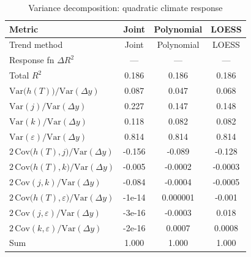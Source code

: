 \begin{table}[htbp]
\centering
\caption{Variance decomposition: quadratic climate response}
\label{tab:variance_decomp_quadratic}

\small
\begin{tabular}{@{}lccc@{}}
\toprule
Metric & Joint & Polynomial & LOESS \\
\midrule
Trend method & Joint & Polynomial & LOESS \\
\midrule
Response fn $\Delta R^2$ & — & — & — \\
Total $R^2$ & 0.186 & 0.186 & 0.186 \\
\midrule
$\mathrm{Var}\!\big(h(T)\big)/\mathrm{Var}(\Delta y)$ & 0.087 & 0.047 & 0.068 \\
$\mathrm{Var}(j)/\mathrm{Var}(\Delta y)$ & 0.227 & 0.147 & 0.148 \\
$\mathrm{Var}(k)/\mathrm{Var}(\Delta y)$ & 0.118 & 0.082 & 0.082 \\
$\mathrm{Var}(\varepsilon)/\mathrm{Var}(\Delta y)$ & 0.814 & 0.814 & 0.814 \\
\midrule
$2\,\mathrm{Cov}\!\big(h(T),j\big)/\mathrm{Var}(\Delta y)$ & -0.156 & -0.089 & -0.128 \\
$2\,\mathrm{Cov}\!\big(h(T),k\big)/\mathrm{Var}(\Delta y)$ & -0.005 & -0.0002 & -0.0003 \\
$2\,\mathrm{Cov}(j,k)/\mathrm{Var}(\Delta y)$ & -0.084 & -0.0004 & -0.0005 \\
$2\,\mathrm{Cov}\!\big(h(T),\varepsilon\big)/\mathrm{Var}(\Delta y)$ & -1e-14 & 0.000001 & -0.001 \\
$2\,\mathrm{Cov}(j,\varepsilon)/\mathrm{Var}(\Delta y)$ & -3e-16 & -0.0003 & 0.018 \\
$2\,\mathrm{Cov}(k,\varepsilon)/\mathrm{Var}(\Delta y)$ & -2e-16 & 0.0007 & 0.0008 \\
\midrule
Sum & 1.000 & 1.000 & 1.000 \\
\bottomrule
\end{tabular}
\end{table}